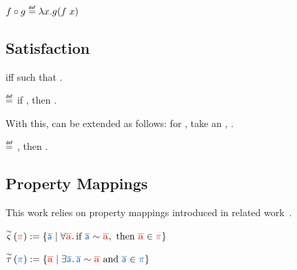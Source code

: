 \documentclass[a4paper,12pt]{article}
\begin{document}
\begin{definition}{}
  $\fncompo{f}{g}\isdef \lambda x.g(f\;x)$
\end{definition}

\subsection{Satisfaction}
 iff  such that .

\begin{definition}{}
    \bul{$\sat{\varWholeProg}{\varProperty}$}
    $\isdef$
    if \iul{$\forall\varRuntimeTerm\ \varTrace, %
      \progstepto{\varWholeProg}{\varRuntimeTerm}{\varTrace}$
    },
    then \oul{$\varTrace\in\varProperty$}.
\end{definition}

With this,  can be extended as follows: for , take an , .

\begin{definition}{}
  \bul{$\rsat{\varComponent}{\varProperty}$} %
  $\isdef$ %
  , %
    then \oul{$\sat{\varWholeProg}{\varProperty}$%
  }.
\end{definition}


\subsection{Property Mappings}

This work relies on property mappings introduced in related work~\cite{abate2021extacc}.

\begin{definition}{}
  $ 
    \mapUniversal{\sim}{\trgProperty} := 
      \lrbraces{\srcTrace \mid %
        \forall \trgTrace\ldotp \text{if }\xrelTraces{\srcTrace}{\trgTrace}, \text{ then }%
        \trgTrace\in\trgProperty
      }
  $
\end{definition}
\begin{definition}{}
  $ 
    \mapExistential{\sim}{\srcProperty} := 
      \lrbraces{\trgTrace \mid %
        \exists \srcTrace\ldotp \xrelTraces{\srcTrace}{\trgTrace} \text{ and }%
        \srcTrace\in\srcProperty
      }
  $
\end{definition}
\end{document}

